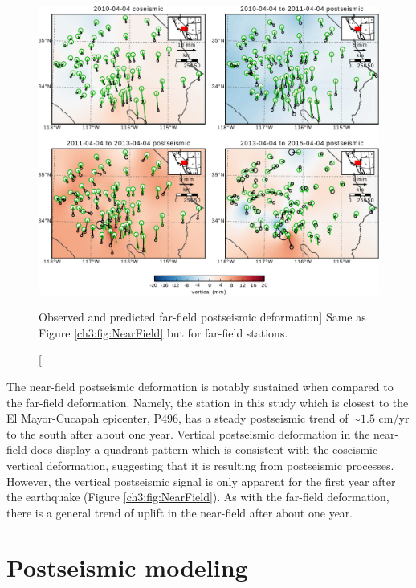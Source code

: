 \begin{figure}
\includegraphics[scale=0.9]{ch3/figures/2016jb013114-p05}
\caption
[Observed and predicted far-field postseismic deformation]
{Same as Figure \ref{ch3:fig:NearField} but for far-field stations.}
\label{ch3:fig:FarField}
\end{figure}

The near-field postseismic deformation is notably sustained when
compared to the far-field deformation.  Namely, the station in this
study which is closest to the El Mayor-Cucapah epicenter, P496, has a
steady postseismic trend of ${\sim}1.5$ cm/yr to the south after about
one year.  Vertical postseismic deformation in the near-field does
display a quadrant pattern which is consistent with the coseismic
vertical deformation, suggesting that it is resulting from postseismic
processes.  However, the vertical postseismic signal is only apparent
for the first year after the earthquake (Figure
\ref{ch3:fig:NearField}).  As with the far-field deformation, there is
a general trend of uplift in the near-field after about one year.

\section{Postseismic modeling}\label{ch3:sec:Model}

